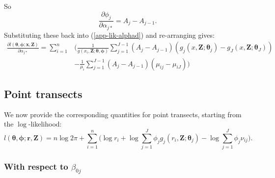 \documentclass{report}
\begin{document}
So
\begin{equation*}
\frac{\partial \phi_j}{\partial \alpha_{j*}} = A_j - A_{j-1}.
\end{equation*}
Substituting these back into (\ref{app-lik-alphad}) and re-arranging gives:
\begin{align*}
\frac{\partial l(\bm{\theta},\bm{\phi}; \mathbf{x},\mathbf{Z})}{\partial \alpha_{j*}} = \sum_{i=1}^n & \Big( \frac{1}{g(x_i,\mathbf{Z}; \bm{\theta},\bm{\phi})} \sum_{j=1}^{J-1} (A_j - A_{j-1}) (g_j(x,\mathbf{Z}; \bm{\theta}_j) - g_J(x,\mathbf{Z}; \bm{\theta}_J))\\
&- \frac{1}{\mu_i} \sum_{j=1}^{J-1}(A_j - A_{j-1})(\mu_{ij} - \mu_{iJ}) \Big)
\end{align*}

\subsection*{Point transects}

We now provide the corresponding quantities for point transects, starting from the $\log$-likelihood:
\begin{equation}
l(\bm{\theta}, \bm{\phi}; \mathbf{r},\mathbf{Z}) = n \log 2 \pi + \sum_{i=1}^n \Big( \log r_i + \log \sum_{j=1}^J \phi_j g_j(r_i,\mathbf{Z}; \bm{\theta}_j) - \log \sum_{j=1}^J \phi_j \nu_{ij}\Big).
\label{pt-lik}
\end{equation}


\subsubsection*{With respect to $\beta_{0j}$}
\end{document}
